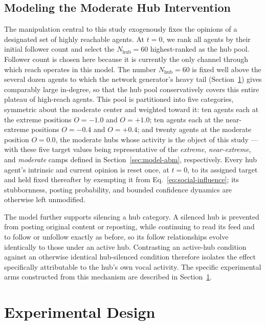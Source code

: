 \documentclass{svproc}
\def\Black{\color[rgb]{0,0,0}}
\begin{document}
\subsection{Modeling the Moderate Hub Intervention}\label{sec:model-intervention}
The manipulation central to this study exogenously fixes the opinions
of a designated set of highly reachable agents. At $t=0$, we rank all
agents by their initial follower count and select the
$N_{\mathrm{hub}}=60$ highest-ranked as the hub pool. Follower count
is chosen here because it is currently the only channel through which
reach operates in this model. The number $N_{\mathrm{hub}}=60$ is
fixed well above the several dozen agents to which the network
generator's heavy tail (Section~\ref{sec:experiments}) gives
comparably large in-degree, so that the hub pool conservatively covers
this entire plateau of high-reach agents. This pool is partitioned
into five categories, symmetric about the moderate center and weighted
toward it: ten agents each at the extreme positions $O=-1.0$ and
$O=+1.0$; ten agents each at the near-extreme positions $O=-0.4$ and
$O=+0.4$; and twenty agents at the moderate position $O=0.0$, the
moderate hubs whose activity is the object of this study --- with
these five target values being representative of the \emph{extreme},
\emph{near-extreme}, and \emph{moderate} camps defined in
Section~\ref{sec:model-abm}, respectively. Every hub agent's intrinsic
and current opinion is reset once, at $t=0$, to its assigned target
and held fixed thereafter by exempting it from
Eq.~\eqref{eq:social-influence}; its stubbornness, posting
probability, and bounded confidence dynamics are otherwise left
unmodified.
\par

The model further supports silencing a hub category. A silenced hub is
prevented from posting original content or reposting, while continuing
to read its feed and to follow or unfollow exactly as before, so its
follow relationships evolve identically to those under an active
hub. Contrasting an active-hub condition against an otherwise
identical hub-silenced condition therefore isolates the effect
specifically attributable to the hub's own vocal activity. The
specific experimental arms constructed from this mechanism are
described in Section~\ref{sec:experiments}.
\par

%
\Black%
%

\section{Experimental Design}\label{sec:experiments}
\end{document}
